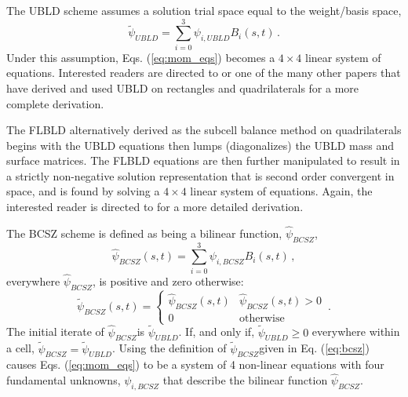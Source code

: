 \documentclass{mc2015}
\newcommand{\benum}{\begin{equation}} 			%
\newcommand{\eenum}{\end{equation}}
\newcommand{\eqt}[1]{Eq. (\ref{#1})}  %
\newcommand{\eqts}[1]{Eqs. (\ref{#1})}  %
\newcommand{\B}[1]{\ensuremath{{B_{#1} }}}
\newcommand{\BCSZ}{\ensuremath{\widetilde{\psi}_{BCSZ}}}
\newcommand{\BCSZH}{\ensuremath{\widehat{\psi}_{BCSZ}}}
\newcommand{\pec}{\, ,}
\newcommand{\pep}{\, .}
\begin{document}
The UBLD scheme assumes a solution trial space equal to the weight/basis space,
\benum
\widetilde{\psi}_{UBLD} = \sum_{i=0}^3{\psi_{i,UBLD} \B{i}(s,t)  } \pep
\eenum
Under this assumption, \eqts{eq:mom_eqs} becomes a $4\times 4$ linear system of equations.  Interested readers are directed to \cite{adams_dfem} or one of the many other papers that have derived and used UBLD on rectangles and quadrilaterals for a more complete derivation.

The FLBLD \cite{flbld,adams_dfem} alternatively derived as the subcell balance method on quadrilaterals \cite{adams_scb} begins with the UBLD equations then lumps (diagonalizes) the UBLD mass and surface matrices.  The FLBLD equations are then further manipulated to result in a strictly non-negative solution representation that is second order convergent in space, and is found by solving a $4\times 4$ linear system of equations.  Again, the interested reader is directed to \cite{flbld,adams_dfem,adams_scb} for a more detailed derivation.

The BCSZ scheme is defined as being a bilinear function, \BCSZH, 
\benum
\BCSZH(s,t) = \sum_{i=0}^3{\psi_{i,BCSZ} \B{i}(s,t)} \pec
\eenum
everywhere \BCSZH, is positive and zero otherwise:
\benum
\BCSZ(s,t) = \left \{ \begin{array}{ll}
\BCSZH(s,t) & \BCSZH(s,t) > 0 \\
0	& \text{otherwise}
\end{array}
\right. \pep
\label{eq:bcsz}
\eenum
The initial iterate of \BCSZH is $\widetilde{\psi}_{UBLD}$.  If, and only if, $\widetilde{\psi}_{UBLD} \geq 0 $ everywhere within a cell, $\BCSZ = \widetilde{\psi}_{UBLD}$.
Using the definition of \BCSZ given in \eqt{eq:bcsz} causes \eqts{eq:mom_eqs} to be a system of 4 non-linear equations with four fundamental unknowns, $\psi_{i,BCSZ}$ that describe the bilinear function \BCSZH.
\end{document}
